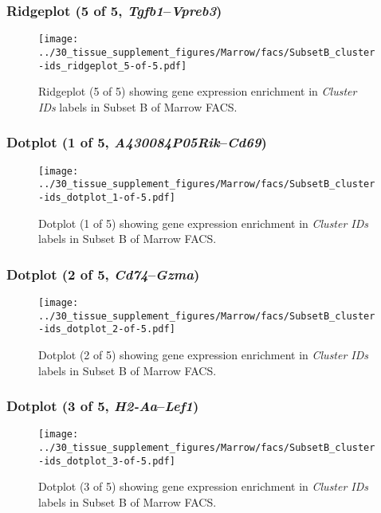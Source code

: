 \clearpage

\subsubsection{Ridgeplot (5 of 5, \emph{Tgfb1}--\emph{Vpreb3})}
\begin{figure}[h]
\centering
\texttt{[image: ../30\_tissue\_supplement\_figures/Marrow/facs/SubsetB\_cluster-ids\_ridgeplot\_5-of-5.pdf]}

\caption{ Ridgeplot (5 of 5)  showing gene expression enrichment in \emph{Cluster IDs} labels in Subset B of Marrow FACS. }
\end{figure}


\clearpage

\subsubsection{Dotplot (1 of 5, \emph{A430084P05Rik}--\emph{Cd69})}
\begin{figure}[h]
\centering
\texttt{[image: ../30\_tissue\_supplement\_figures/Marrow/facs/SubsetB\_cluster-ids\_dotplot\_1-of-5.pdf]}

\caption{ Dotplot (1 of 5)  showing gene expression enrichment in \emph{Cluster IDs} labels in Subset B of Marrow FACS. }
\end{figure}


\clearpage

\subsubsection{Dotplot (2 of 5, \emph{Cd74}--\emph{Gzma})}
\begin{figure}[h]
\centering
\texttt{[image: ../30\_tissue\_supplement\_figures/Marrow/facs/SubsetB\_cluster-ids\_dotplot\_2-of-5.pdf]}

\caption{ Dotplot (2 of 5)  showing gene expression enrichment in \emph{Cluster IDs} labels in Subset B of Marrow FACS. }
\end{figure}


\clearpage

\subsubsection{Dotplot (3 of 5, \emph{H2-Aa}--\emph{Lef1})}
\begin{figure}[h]
\centering
\texttt{[image: ../30\_tissue\_supplement\_figures/Marrow/facs/SubsetB\_cluster-ids\_dotplot\_3-of-5.pdf]}

\caption{ Dotplot (3 of 5)  showing gene expression enrichment in \emph{Cluster IDs} labels in Subset B of Marrow FACS. }
\end{figure}


